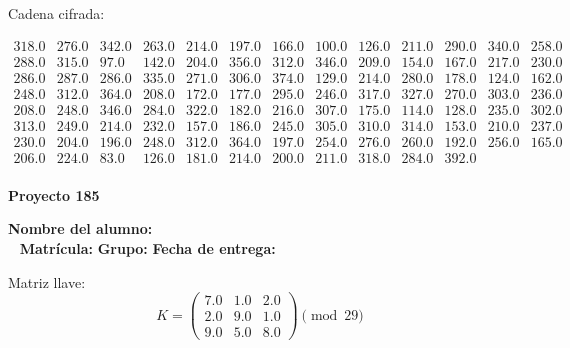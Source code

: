 \documentclass[12pt]{article}
\begin{document}
Cadena cifrada:
\begin{center}
$\begin{array}{lllllllllllll}
318.0 & 276.0 & 342.0 & 263.0 & 214.0 & 197.0 & 166.0 & 100.0 & 126.0 & 211.0 & 290.0 & 340.0 & 258.0\\
288.0 & 315.0 & 97.0 & 142.0 & 204.0 & 356.0 & 312.0 & 346.0 & 209.0 & 154.0 & 167.0 & 217.0 & 230.0\\
286.0 & 287.0 & 286.0 & 335.0 & 271.0 & 306.0 & 374.0 & 129.0 & 214.0 & 280.0 & 178.0 & 124.0 & 162.0\\
248.0 & 312.0 & 364.0 & 208.0 & 172.0 & 177.0 & 295.0 & 246.0 & 317.0 & 327.0 & 270.0 & 303.0 & 236.0\\
208.0 & 248.0 & 346.0 & 284.0 & 322.0 & 182.0 & 216.0 & 307.0 & 175.0 & 114.0 & 128.0 & 235.0 & 302.0\\
313.0 & 249.0 & 214.0 & 232.0 & 157.0 & 186.0 & 245.0 & 305.0 & 310.0 & 314.0 & 153.0 & 210.0 & 237.0\\
230.0 & 204.0 & 196.0 & 248.0 & 312.0 & 364.0 & 197.0 & 254.0 & 276.0 & 260.0 & 192.0 & 256.0 & 165.0\\
206.0 & 224.0 & 83.0 & 126.0 & 181.0 & 214.0 & 200.0 & 211.0 & 318.0 & 284.0 & 392.0\\
\end{array}$
\end{center}

\newpage


\textbf{Proyecto 185}

\textbf{Nombre del alumno:} \underline{\hspace{13cm}}\\\
\vspace{1cm}
\textbf{Matrícula:} \underline{\hspace{4cm}} \hspace{1cm}
\textbf{Grupo:} \underline{\hspace{2cm}}
\textbf{Fecha de entrega:} \underline{\hspace{2cm}}

\medskip

Matriz llave:
\[
K = \begin{pmatrix}
7.0 & 1.0 & 2.0\\
2.0 & 9.0 & 1.0\\
9.0 & 5.0 & 8.0
\end{pmatrix} \pmod{29}
\]
\end{document}
